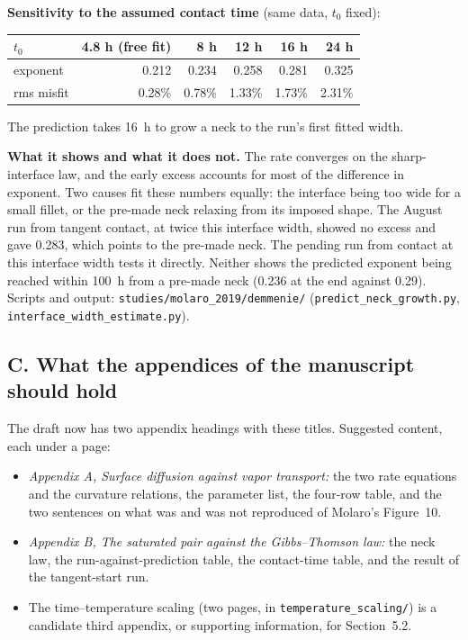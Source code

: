 \documentclass[11pt]{article}
\begin{document}
\textbf{Sensitivity to the assumed contact time} (same data, $t_0$ fixed):
\begin{center}\small\begin{tabular}{lrrrrr}\toprule
$t_0$ & 4.8 h (free fit) & 8 h & 12 h & 16 h & 24 h\\\midrule
exponent & 0.212 & 0.234 & 0.258 & 0.281 & 0.325\\
rms misfit & 0.28\% & 0.78\% & 1.33\% & 1.73\% & 2.31\%\\\bottomrule
\end{tabular}\end{center}
The prediction takes 16~h to grow a neck to the run's first fitted width.

\textbf{What it shows and what it does not.} The rate converges on the
sharp-interface law, and the early excess accounts for most of the
difference in exponent. Two causes fit these numbers equally: the interface
being too wide for a small fillet, or the pre-made neck relaxing from its
imposed shape. The August run from tangent contact, at twice this interface
width, showed no excess and gave 0.283, which points to the pre-made neck.
The pending run from contact at this interface width tests it directly.
Neither shows the predicted exponent being reached within 100~h from a
pre-made neck (0.236 at the end against 0.29). Scripts and output:
\texttt{studies/molaro\_2019/demmenie/} (\texttt{predict\_neck\_growth.py},
\texttt{interface\_width\_estimate.py}).

\subsection*{C. What the appendices of the manuscript should hold}
The draft now has two appendix headings with these titles. Suggested
content, each under a page:
\begin{itemize}
\item \emph{Appendix A, Surface diffusion against vapor transport:} the two
  rate equations and the curvature relations, the parameter list, the
  four-row table, and the two sentences on what was and was not reproduced
  of Molaro's Figure~10.
\item \emph{Appendix B, The saturated pair against the Gibbs--Thomson law:}
  the neck law, the run-against-prediction table, the contact-time table,
  and the result of the tangent-start run.
\item The time--temperature scaling (two pages, in
  \texttt{temperature\_scaling/}) is a
  candidate third appendix, or supporting information, for Section~5.2.
\end{itemize}
\end{document}
